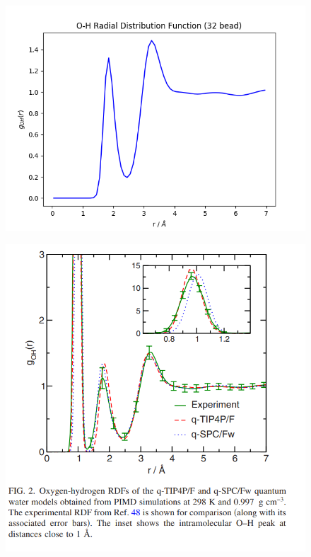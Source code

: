 \documentclass[12pt,reqno]{amsart}
\numberwithin{equation}{section}
\begin{document}
\begin{enumerate}
\begin{figure}[H]
\centering
\includegraphics[scale=0.6]{0_1-32bead-tip4pF.png}
\end{figure}

\begin{figure}[H]
\centering
\includegraphics[scale=0.6]{Markland-0_1-RDF}
\end{figure}


\end{enumerate}
\end{document}

